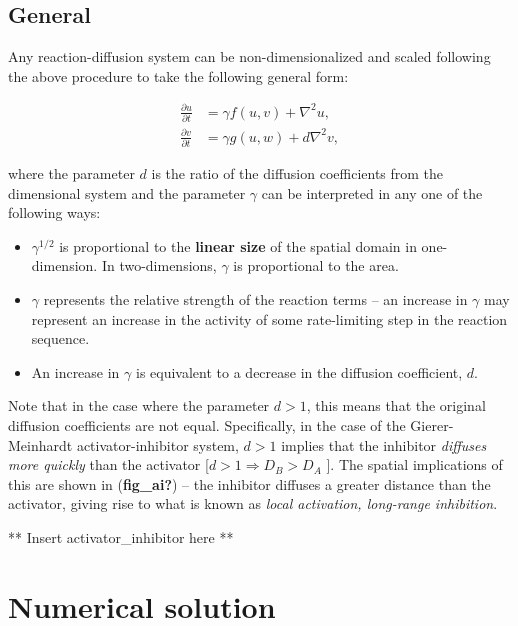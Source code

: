 \documentclass[
  letterpaper,
  DIV=11,
  numbers=noendperiod]{scrreprt}
\providecommand{\tightlist}{%
  \setlength{\itemsep}{0pt}\setlength{\parskip}{0pt}}\usepackage{longtable,booktabs,array}
\theoremstyle{plain}
\theoremstyle{definition}
\theoremstyle{plain}
\theoremstyle{remark}
\begin{document}
\hypertarget{general}{%
\subsection{General}\label{general}}

Any reaction-diffusion system can be non-dimensionalized and scaled
following the above procedure to take the following general form:

\[
\begin{aligned}
\frac{\partial u}{\partial  t} & = \gamma f(u,v)  + \nabla^2 u, \\
\frac{\partial v}{\partial  t} & = \gamma g(u,w)  + d \nabla^2 v, 
\end{aligned}
\]

where the parameter \(d\) is the ratio of the diffusion coefficients
from the dimensional system and the parameter \(\gamma\) can be
interpreted in any one of the following ways:

\begin{itemize}
\tightlist
\item
  \(\gamma^{1/2}\) is proportional to the \textbf{linear size} of the
  spatial domain in one-dimension. In two-dimensions, \(\gamma\) is
  proportional to the area.
\item
  \(\gamma\) represents the relative strength of the reaction terms --
  an increase in \(\gamma\) may represent an increase in the activity of
  some rate-limiting step in the reaction sequence.
\item
  An increase in \(\gamma\) is equivalent to a decrease in the diffusion
  coefficient, \(d\).
\end{itemize}

Note that in the case where the parameter \(d > 1\), this means that the
original diffusion coefficients are not equal. Specifically, in the case
of the Gierer-Meinhardt activator-inhibitor system, \(d >1\) implies
that the inhibitor \emph{diffuses more quickly} than the activator
{[}\(d > 1 \Rightarrow D_B > D_A\) {]}. The spatial implications of this
are shown in (\textbf{fig\_ai?}) -- the inhibitor diffuses a greater
distance than the activator, giving rise to what is known as \emph{local
activation, long-range inhibition}.

** Insert activator\_inhibitor here **

\hypertarget{numerical-solution-1}{%
\section{Numerical solution}\label{numerical-solution-1}}
\end{document}

